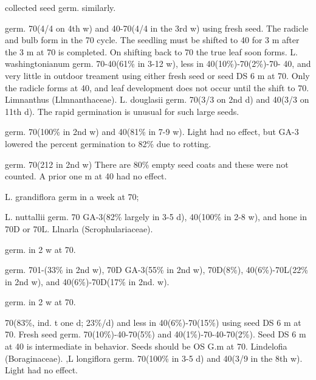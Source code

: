 \begin{description}
collected seed germ. similarly.
\item[L. tsingtauense] germ. 70(4/4 on 4th w) and 40-70(4/4 in the 3rd w) using fresh
seed. The radicle and bulb form in the 70 cycle. The seedling must be shifted to 40 for
3 m after the 3 m at 70 is completed. On shifting back to 70 the true leaf soon forms.
L. washingtonianum germ. 70-40(61\% in 3-12 w), less in 40(10\%)-70(2\%)-70-
40, and very little in outdoor treament using either fresh seed or seed DS 6 m at 70.
Only the radicle forms at 40, and leaf development does not occur until the shift to 70.
Limnanthus (Llmnanthaceae). L. douglasii germ. 70(3/3 on 2nd d) and
40(3/3 on 11th d). The rapid germination is unusual for such large seeds.

\item[Limonium (Plumbaginaceae)]
\item[L. latifolium] germ. 70(100\% in 2nd w) and 40(81\% in 7-9 w). Light had no
effect, but GA-3 lowered the percent germination to 82\% due to rotting.
\item[L. minutum] germ. 70(212 in 2nd w) There are 80\% empty seed coats and these
were not counted. A prior one m at 40 had no effect.

\item[Linanthus (Polemoniaceae)] L. grandiflora germ in a week at 70;
\item[Linanthrastum (Polemoniaceae)] L. nuttallii germ. 70 GA-3(82\% largely in
3-5 d), 40(100\% in 2-8 w), and hone in 70D or 70L.
Llnarla (Scrophulariaceae).
\item[L. kurdica] germ. in 2 w at 70.
\item[L. purpurea] germ. 701-(33\% in 2nd w), 70D GA-3(55\% in 2nd w), 70D(8\%),
40(6\%)-70L(22\% in 2nd w), and 40(6\%)-70D(17\% in 2nd. w).
\item[L. pyramidata] germ. in 2 w at 70.
\item[L. trystis] 70(83\%, ind. t one d; 23\%/d) and less in 40(6\%)-70(15\%) using seed
DS 6 m at 70. Fresh seed germ. 70(10\%)-40-70(5\%) and 40(1\%)-70-40-70(2\%).
Seed DS 6 m at 40 is intermediate in behavior. Seeds should be OS G.m at 70.
Lindelofia (Boraginaceae). ,L longiflora germ. 70(100\% in 3-5 d) and
40(3/9 in the 8th w). Light had no effect.


\end{description}
